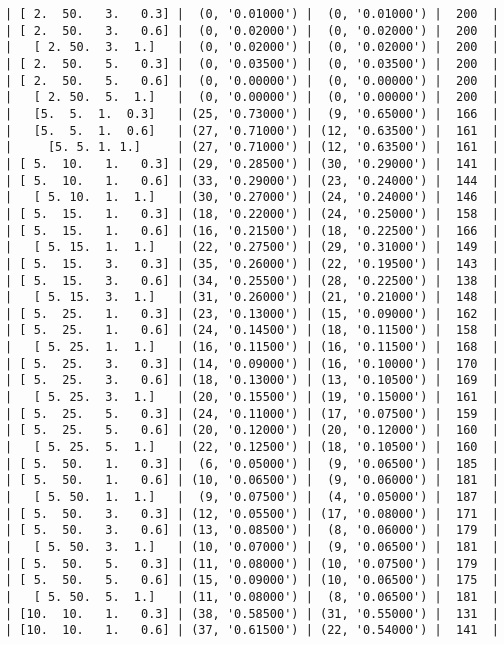 \documentclass{article}
\begin{document}
\begin{verbatim}
| [ 2.  50.   3.   0.3] |  (0, '0.01000') |  (0, '0.01000') |  200  |
| [ 2.  50.   3.   0.6] |  (0, '0.02000') |  (0, '0.02000') |  200  |
|   [ 2. 50.  3.  1.]   |  (0, '0.02000') |  (0, '0.02000') |  200  |
| [ 2.  50.   5.   0.3] |  (0, '0.03500') |  (0, '0.03500') |  200  |
| [ 2.  50.   5.   0.6] |  (0, '0.00000') |  (0, '0.00000') |  200  |
|   [ 2. 50.  5.  1.]   |  (0, '0.00000') |  (0, '0.00000') |  200  |
|   [5.  5.  1.  0.3]   | (25, '0.73000') |  (9, '0.65000') |  166  |
|   [5.  5.  1.  0.6]   | (27, '0.71000') | (12, '0.63500') |  161  |
|     [5. 5. 1. 1.]     | (27, '0.71000') | (12, '0.63500') |  161  |
| [ 5.  10.   1.   0.3] | (29, '0.28500') | (30, '0.29000') |  141  |
| [ 5.  10.   1.   0.6] | (33, '0.29000') | (23, '0.24000') |  144  |
|   [ 5. 10.  1.  1.]   | (30, '0.27000') | (24, '0.24000') |  146  |
| [ 5.  15.   1.   0.3] | (18, '0.22000') | (24, '0.25000') |  158  |
| [ 5.  15.   1.   0.6] | (16, '0.21500') | (18, '0.22500') |  166  |
|   [ 5. 15.  1.  1.]   | (22, '0.27500') | (29, '0.31000') |  149  |
| [ 5.  15.   3.   0.3] | (35, '0.26000') | (22, '0.19500') |  143  |
| [ 5.  15.   3.   0.6] | (34, '0.25500') | (28, '0.22500') |  138  |
|   [ 5. 15.  3.  1.]   | (31, '0.26000') | (21, '0.21000') |  148  |
| [ 5.  25.   1.   0.3] | (23, '0.13000') | (15, '0.09000') |  162  |
| [ 5.  25.   1.   0.6] | (24, '0.14500') | (18, '0.11500') |  158  |
|   [ 5. 25.  1.  1.]   | (16, '0.11500') | (16, '0.11500') |  168  |
| [ 5.  25.   3.   0.3] | (14, '0.09000') | (16, '0.10000') |  170  |
| [ 5.  25.   3.   0.6] | (18, '0.13000') | (13, '0.10500') |  169  |
|   [ 5. 25.  3.  1.]   | (20, '0.15500') | (19, '0.15000') |  161  |
| [ 5.  25.   5.   0.3] | (24, '0.11000') | (17, '0.07500') |  159  |
| [ 5.  25.   5.   0.6] | (20, '0.12000') | (20, '0.12000') |  160  |
|   [ 5. 25.  5.  1.]   | (22, '0.12500') | (18, '0.10500') |  160  |
| [ 5.  50.   1.   0.3] |  (6, '0.05000') |  (9, '0.06500') |  185  |
| [ 5.  50.   1.   0.6] | (10, '0.06500') |  (9, '0.06000') |  181  |
|   [ 5. 50.  1.  1.]   |  (9, '0.07500') |  (4, '0.05000') |  187  |
| [ 5.  50.   3.   0.3] | (12, '0.05500') | (17, '0.08000') |  171  |
| [ 5.  50.   3.   0.6] | (13, '0.08500') |  (8, '0.06000') |  179  |
|   [ 5. 50.  3.  1.]   | (10, '0.07000') |  (9, '0.06500') |  181  |
| [ 5.  50.   5.   0.3] | (11, '0.08000') | (10, '0.07500') |  179  |
| [ 5.  50.   5.   0.6] | (15, '0.09000') | (10, '0.06500') |  175  |
|   [ 5. 50.  5.  1.]   | (11, '0.08000') |  (8, '0.06500') |  181  |
| [10.  10.   1.   0.3] | (38, '0.58500') | (31, '0.55000') |  131  |
| [10.  10.   1.   0.6] | (37, '0.61500') | (22, '0.54000') |  141  |

\end{verbatim}
\end{document}
